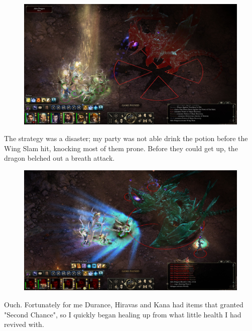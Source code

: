 \documentclass{article}
\begin{document}
\begin{figure}
\includegraphics[scale=0.33]{files/blog/2019_03_17_pillars_of_eternity_path_of_the_damned_act_iv/2019_03_17_dragon1_01.jpg}
\end{figure}

The strategy was a disaster; my party was not able drink the potion before the Wing Slam hit, knocking most of them prone.  Before they could get up, the dragon belched out a breath attack.

\begin{figure}
\includegraphics[scale=0.33]{files/blog/2019_03_17_pillars_of_eternity_path_of_the_damned_act_iv/2019_03_17_dragon1_02.jpg}
\end{figure}

Ouch.  Fortunately for me Durance, Hiravas and Kana had items that granted "Second Chance", so I quickly began healing up from what little health I had revived with.
\end{document}
